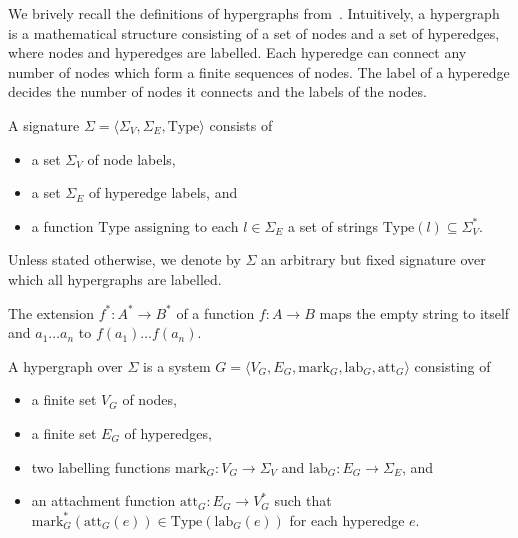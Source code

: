 We brively recall the definitions of hypergraphs from~\cite{plump2018modular}.
Intuitively, a hypergraph is a mathematical structure consisting of a set of nodes and a set of hyperedges, where nodes and hyperedges are labelled. Each hyperedge can connect any number of nodes which form a finite sequences of nodes. The label of a hyperedge decides the number of nodes it connects and the labels of the nodes.
\begin{definition}
    A signature $\Sigma = \langle \Sigma_V, \Sigma_E, \text{Type} \rangle$ consists of 
    \begin{itemize}
        \item a set $\Sigma_V$ of node labels,
        \item a set $\Sigma_E$ of hyperedge labels, and
        \item a function $\text{Type}$ assigning to each $l \in \Sigma_E$ a set of strings $\text{Type}(l) \subseteq \Sigma_V^*$.
    \end{itemize}
\end{definition}
Unless stated otherwise, we denote by $\Sigma$ an arbitrary but fixed signature over which all hypergraphs are labelled.
\begin{remark}
    The extension $f^* : A^* \to B^*$ of a function $f : A \to B$ maps the empty string to itself and $a_1 \ldots a_n$ to $f(a_1) \ldots f(a_n)$.
\end{remark}
\begin{definition}
    A hypergraph over $\Sigma$ is a system $G = \langle V_G, E_G, \text{mark}_G, \text{lab}_G, \text{att}_G \rangle$ consisting of 
    \begin{itemize}
        \item a finite set $V_G$ of nodes,
        \item a finite set $E_G$ of hyperedges,
        \item two labelling functions $\text{mark}_G : V_G \to \Sigma_V$ and $\text{lab}_G : E_G \to \Sigma_E$, and
        \item an attachment function $\text{att}_G : E_G \to V_G^*$ such that $\text{mark}_G^*(\text{att}_G(e)) \in \text{Type}(\text{lab}_G(e))$ for each hyperedge $e$.
    \end{itemize} 
\end{definition} 

